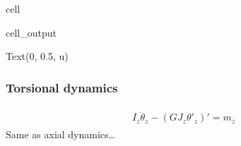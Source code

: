 \documentclass[letterpaper,10pt,english]{jupyterBook}
\begin{document}
\begin{sphinxuseclass}{cell}
\begin{sphinxVerbatimOutput}
\begin{sphinxuseclass}{cell_output}
\begin{sphinxVerbatim}[commandchars=\\\{\}]
Text(0, 0.5, \PYGZsq{}u\PYGZsq{})
\end{sphinxVerbatim}

\noindent{}

\end{sphinxuseclass}\end{sphinxVerbatimOutput}

\end{sphinxuseclass}

\subsubsection{Torsional dynamics}
\label{\detokenize{ch/solids/small-displacements-fem-beams-decoupled:torsional-dynamics}}\begin{equation*}
\begin{split}\begin{aligned}
  I_z \ddot{\theta}_z - \left( GJ_z \theta'_z \right)' = m_z
\end{aligned}\end{split}
\end{equation*}
\sphinxAtStartPar
Same as axial dynamics…
\end{document}
